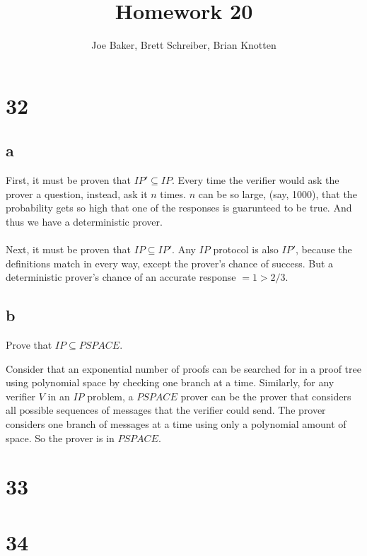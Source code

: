 \documentclass[letterpaper,notitlepage,twoside]{article}
\begin{document}
\title{Homework 20}
\author{Joe Baker, Brett Schreiber, Brian Knotten}
\maketitle

\section*{32}
\subsection*{a}
First, it must be proven that $IP' \subseteq IP$.
Every time the verifier would ask the prover a question, instead, ask it $n$ times. $n$ can be so large, (say, 1000), that the
probability gets so high that one of the responses is guarunteed to be true. And thus we have a deterministic prover. \\\\

Next, it must be proven that $IP \subseteq IP'$.
Any $IP$ protocol is also $IP'$, because the definitions match in every way, except the prover's chance of success.
But a deterministic prover's chance of an accurate response $= 1 > 2/3$.

\subsection*{b}
Prove that $IP \subseteq PSPACE$.

Consider that an exponential number of proofs can be searched for in a proof tree using polynomial space by checking one branch at a time. Similarly, for any verifier $V$ in an $IP$ problem, a $PSPACE$ prover can be the prover that considers all possible sequences of messages that the verifier could send. The prover considers one branch of messages at a time using only a polynomial amount of space. So the prover is in $PSPACE$.

\section*{33}

\section*{34}
\end{document}
